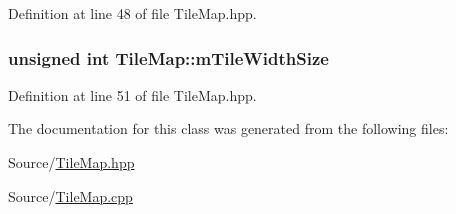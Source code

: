 Definition at line 48 of file Tile\-Map.\-hpp.

\hypertarget{class_tile_map_a98fe1a15d2a9fae5ecd3290fc9700661}{
\subsubsection[{m\-Tile\-Width\-Size}]{\setlength{\rightskip}{0pt plus 5cm}unsigned int Tile\-Map\-::m\-Tile\-Width\-Size\hspace{0.3cm}{\ttfamily [protected]}}}\label{class_tile_map_a98fe1a15d2a9fae5ecd3290fc9700661}


Definition at line 51 of file Tile\-Map.\-hpp.



The documentation for this class was generated from the following files\-:\begin{DoxyCompactItemize}
\item 
Source/\hyperlink{_tile_map_8hpp}{Tile\-Map.\-hpp}\item 
Source/\hyperlink{_tile_map_8cpp}{Tile\-Map.\-cpp}\end{DoxyCompactItemize}
